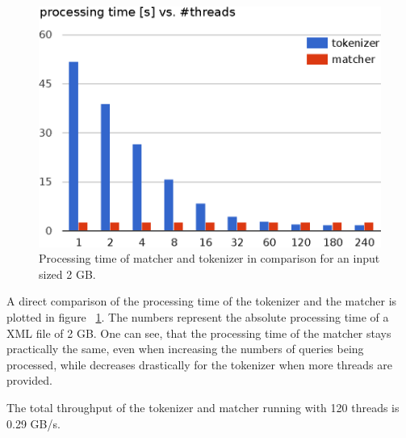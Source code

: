 \begin{figure}[h]\centering
  \includegraphics[scale=.66]{img/matcher_tokenizer_p_time.eps}
  \caption{Processing time of matcher and tokenizer in comparison for an input sized 2 GB.
  \label{matcher_tokenizer_pt}}
\end{figure}
A direct comparison of the processing time of the tokenizer and the matcher is plotted in figure ~\ref{matcher_tokenizer_pt}. The numbers represent the absolute processing time of a XML file of 2 GB. One can see, that the processing time of the matcher stays practically the same, even when increasing the numbers of queries being processed, while decreases drastically for the tokenizer when more threads are provided.

The total throughput of the tokenizer and matcher running with 120 threads is 0.29 GB/s.